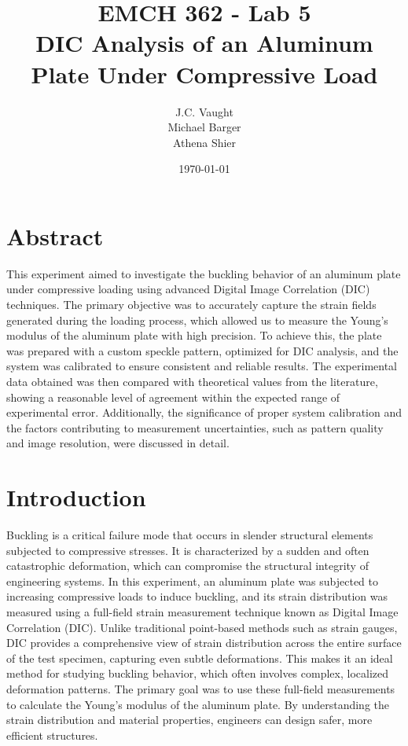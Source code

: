 \documentclass[11pt]{article}
\title{
    \textbf{EMCH 362 - Lab 5} \\
    DIC Analysis of an Aluminum Plate Under Compressive Load
}
\author{
    J.C. Vaught \\
    Michael Barger \\
    Athena Shier
}
\date{\today}
\begin{document}
\maketitle
\newpage

\section*{Abstract}
This experiment aimed to investigate the buckling behavior of an aluminum plate under compressive loading using advanced Digital Image Correlation (DIC) techniques. The primary objective was to accurately capture the strain fields generated during the loading process, which allowed us to measure the Young's modulus of the aluminum plate with high precision. To achieve this, the plate was prepared with a custom speckle pattern, optimized for DIC analysis, and the system was calibrated to ensure consistent and reliable results. The experimental data obtained was then compared with theoretical values from the literature, showing a reasonable level of agreement within the expected range of experimental error. Additionally, the significance of proper system calibration and the factors contributing to measurement uncertainties, such as pattern quality and image resolution, were discussed in detail.

\section*{Introduction}
Buckling is a critical failure mode that occurs in slender structural elements subjected to compressive stresses. It is characterized by a sudden and often catastrophic deformation, which can compromise the structural integrity of engineering systems. In this experiment, an aluminum plate was subjected to increasing compressive loads to induce buckling, and its strain distribution was measured using a full-field strain measurement technique known as Digital Image Correlation (DIC). Unlike traditional point-based methods such as strain gauges, DIC provides a comprehensive view of strain distribution across the entire surface of the test specimen, capturing even subtle deformations. This makes it an ideal method for studying buckling behavior, which often involves complex, localized deformation patterns. The primary goal was to use these full-field measurements to calculate the Young’s modulus of the aluminum plate. By understanding the strain distribution and material properties, engineers can design safer, more efficient structures.
\newpage
\end{document}
